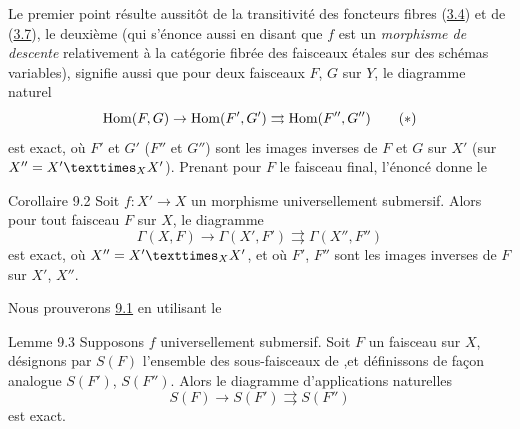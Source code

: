 \documentclass[10pt]{../fichiers-configuration-latex/smfart}
\begin{document}
Le premier point résulte aussitôt de la transitivité des foncteurs
fibres (\hyperref[VIII.subsec3.4]{3.4}) et de (\hyperref[VIII.cor3.7]{3.7}), le deuxième
(qui s'énonce aussi en disant
que $f$ est un \emph{morphisme de descente} relativement à la
catégorie fibrée des faisceaux étales sur des schémas variables),
signifie aussi que pour deux faisceaux $F$, $G$ sur $Y$, le diagramme
naturel
\begin{equation*}
\operatorname{Hom}(F,G)\rightarrow \operatorname{Hom} (F',G')\rightrightarrows \operatorname{Hom} (F'',G'')\tag{$\ast$}
\end{equation*}
est exact, où $F'$ et $G'$ (\resp $F''$ et $G''$) sont les images
inverses de $F$ et $G$ sur $X'$ (\resp sur
$X''=\fprod{X'}{X'}{X}$). Prenant pour $F$ le faisceau final, l'énoncé
donne le

\begin{enonce*}{Corollaire 9.2}
Soit $f:X'\rightarrow X$ un morphisme universellement submersif. Alors
pour tout faisceau $F$ sur $X$, le diagramme
$$
\Gamma(X,F)\rightarrow \Gamma(X',F')\rightrightarrows \Gamma(X'',F'')
$$
est exact, où $X''=\fprod{X'}{X'}{X}$, et où $F'$, $F''$ sont les
images inverses de $F$ sur $X'$, $X''$.
\end{enonce*}

Nous prouverons \hyperref[VIII.prop9.1]{9.1} en utilisant le

\begin{enonce*}{Lemme 9.3}
Supposons $f$ universellement submersif. Soit $F$ un faisceau sur $X$,
désignons par $S(F)$ l'ensemble des sous-faisceaux de ,\pageoriginale  et
définissons de façon analogue $S(F')$, $S(F'')$. Alors le diagramme
d'applications naturelles
$$
S(F)\rightarrow S(F')\rightrightarrows S(F'')
$$
est exact.
\end{enonce*}
\end{document}
